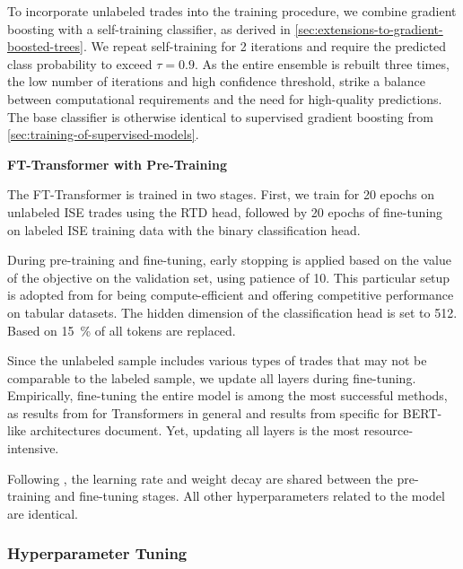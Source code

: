 To incorporate unlabeled trades into the training procedure, we combine gradient boosting with a self-training classifier, as derived in \cref{sec:extensions-to-gradient-boosted-trees}. We repeat self-training for 2 iterations and require the predicted class probability to exceed $\tau=0.9$. As the entire ensemble is rebuilt three times, the low number of iterations and high confidence threshold, strike a balance between computational requirements and the need for high-quality predictions. The base classifier is otherwise identical to supervised gradient boosting from \cref{sec:training-of-supervised-models}.

\textbf{FT-Transformer with Pre-Training}

The FT-Transformer is trained in two stages. First, we train for \num{20} epochs on unlabeled \gls{ISE} trades using the \gls{RTD} head, followed by \num{20} epochs of fine-tuning on labeled \gls{ISE} training data with the binary classification head.

During pre-training and fine-tuning, early stopping is applied based on the value of the objective on the validation set, using patience of \num{10}. This particular setup is adopted from \textcite[\checkmark][15]{rubachevRevisitingPretrainingObjectives2022} for being compute-efficient and offering competitive performance on tabular datasets. The hidden dimension of the classification head is set to \num{512}. Based on \textcite[][3]{clarkElectraPretrainingText2020} \SI{15}{\percent} of all tokens are replaced.

Since the unlabeled sample includes various types of trades that may not be comparable to the labeled sample, we update all layers during fine-tuning. Empirically, fine-tuning the entire model is among the most successful methods, as results from \textcite[\checkmark][104--105]{raeScalingLanguageModels2022} for Transformers in general and results from \textcite[][7]{merchantWhatHappensBERT2020} specific for \gls{BERT}-like architectures document. Yet, updating all layers is the most resource-intensive.

Following \textcite[\checkmark][4]{rubachevRevisitingPretrainingObjectives2022}, the learning rate and weight decay are shared between the pre-training and fine-tuning stages. All other hyperparameters related to the model are identical.

\subsubsection{Hyperparameter Tuning}\label{sec:hyperparameter-tuning}

